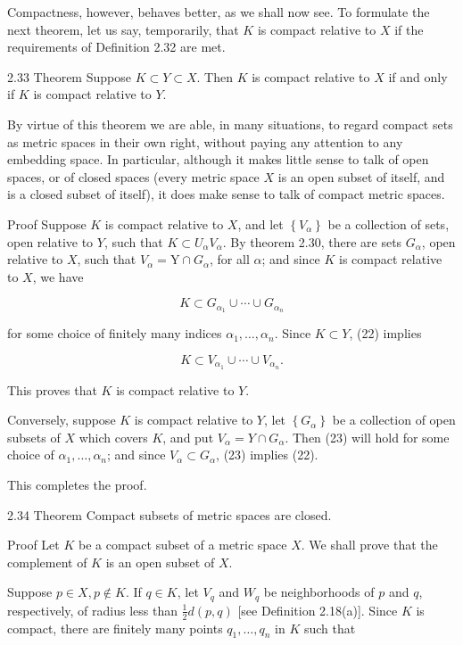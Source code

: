 \documentclass[10pt]{article}
\begin{document}
Compactness, however, behaves better, as we shall now see. To formulate the next theorem, let us say, temporarily, that $K$ is compact relative to $X$ if the requirements of Definition 2.32 are met.

2.33 Theorem Suppose $K \subset Y \subset X$. Then $K$ is compact relative to $X$ if and only if $K$ is compact relative to $Y$.

By virtue of this theorem we are able, in many situations, to regard compact sets as metric spaces in their own right, without paying any attention to any embedding space. In particular, although it makes little sense to talk of open spaces, or of closed spaces (every metric space $X$ is an open subset of itself, and is a closed subset of itself), it does make sense to talk of compact metric spaces.

Proof Suppose $K$ is compact relative to $X$, and let $\left\{V_{\alpha}\right\}$ be a collection of sets, open relative to $Y$, such that $K \subset U_{\alpha} V_{\alpha}$. By theorem 2.30, there are sets $G_{\alpha}$, open relative to $X$, such that $V_{\alpha}=\mathrm{Y} \cap G_{\alpha}$, for all $\alpha$; and since $K$ is compact relative to $X$, we have

$$
K \subset G_{\alpha_{1}} \cup \cdots \cup G_{\alpha_{n}}
$$

for some choice of finitely many indices $\alpha_{1}, \ldots, \alpha_{n}$. Since $K \subset Y$, (22) implies

$$
K \subset V_{\alpha_{1}} \cup \cdots \cup V_{\alpha_{n}} .
$$

This proves that $K$ is compact relative to $Y$.

Conversely, suppose $K$ is compact relative to $Y$, let $\left\{G_{\alpha}\right\}$ be a collection of open subsets of $X$ which covers $K$, and put $V_{\alpha}=Y \cap G_{\alpha}$. Then (23) will hold for some choice of $\alpha_{1}, \ldots, \alpha_{n}$; and since $V_{\alpha} \subset G_{\alpha}$, (23) implies (22).

This completes the proof.

2.34 Theorem Compact subsets of metric spaces are closed.

Proof Let $K$ be a compact subset of a metric space $X$. We shall prove that the complement of $K$ is an open subset of $X$.

Suppose $p \in X, p \notin K$. If $q \in K$, let $V_{q}$ and $W_{q}$ be neighborhoods of $p$ and $q$, respectively, of radius less than $\frac{1}{2} d(p, q)$ [see Definition 2.18(a)]. Since $K$ is compact, there are finitely many points $q_{1}, \ldots, q_{n}$ in $K$ such that
\end{document}
